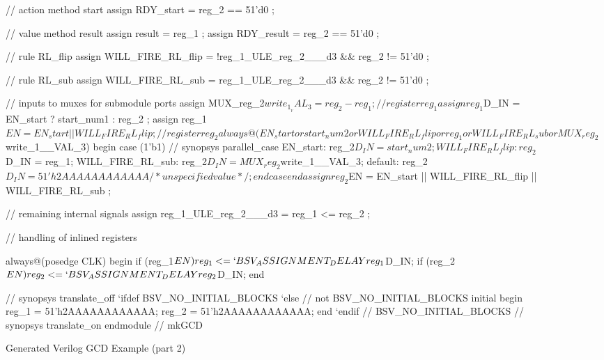 \documentclass{article}
\newenvironment{libverbatim}
  {\small
   \verbatim}
  {\endverbatim
  }
\newenvironment{fminipage}[1][6 in]
  {\begin{lrbox}{\fminibox}\begin{minipage}[c]{6 in}}
  {\end{minipage}\end{lrbox}\fbox{\usebox{\fminibox}}}
\begin{document}
\begin{figure}
\begin{fminipage}
\begin{libverbatim}
 // action method start
  assign RDY_start = reg_2 == 51'd0 ;

  // value method result
  assign result = reg_1 ;
  assign RDY_result = reg_2 == 51'd0 ;

  // rule RL_flip
  assign WILL_FIRE_RL_flip = !reg_1_ULE_reg_2___d3 && reg_2 != 51'd0 ;

  // rule RL_sub
  assign WILL_FIRE_RL_sub = reg_1_ULE_reg_2___d3 && reg_2 != 51'd0 ;

  // inputs to muxes for submodule ports
  assign MUX_reg_2$write_1__VAL_3 = reg_2 - reg_1 ;

  // register reg_1
  assign reg_1$D_IN = EN_start ? start_num1 : reg_2 ;
  assign reg_1$EN = EN_start || WILL_FIRE_RL_flip ;

  // register reg_2
  always@(EN_start or
	  start_num2 or
	  WILL_FIRE_RL_flip or
	  reg_1 or WILL_FIRE_RL_sub or MUX_reg_2$write_1__VAL_3)
  begin
    case (1'b1) // synopsys parallel_case
      EN_start: reg_2$D_IN = start_num2;
      WILL_FIRE_RL_flip: reg_2$D_IN = reg_1;
      WILL_FIRE_RL_sub: reg_2$D_IN = MUX_reg_2$write_1__VAL_3;
      default: reg_2$D_IN = 51'h2AAAAAAAAAAAA /* unspecified value */ ;
    endcase
  end
  assign reg_2$EN = EN_start || WILL_FIRE_RL_flip || WILL_FIRE_RL_sub ;

  // remaining internal signals
  assign reg_1_ULE_reg_2___d3 = reg_1 <= reg_2 ;

  // handling of inlined registers

  always@(posedge CLK)
  begin
    if (reg_1$EN) reg_1 <= `BSV_ASSIGNMENT_DELAY reg_1$D_IN;
    if (reg_2$EN) reg_2 <= `BSV_ASSIGNMENT_DELAY reg_2$D_IN;
  end

  // synopsys translate_off
  `ifdef BSV_NO_INITIAL_BLOCKS
  `else // not BSV_NO_INITIAL_BLOCKS
  initial
  begin
    reg_1 = 51'h2AAAAAAAAAAAA;
    reg_2 = 51'h2AAAAAAAAAAAA;
  end
  `endif // BSV_NO_INITIAL_BLOCKS
  // synopsys translate_on
endmodule  // mkGCD

\end{libverbatim}
\end{fminipage}
\caption{\label{gcd_v-fig2}Generated Verilog GCD Example (part 2)}
\end{figure}


\end{document}
